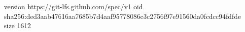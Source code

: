 version https://git-lfs.github.com/spec/v1
oid sha256:ded3aab47616aa7685b7d4aaf95778086c3c2756f97e91560da0fcdcc94fdfde
size 1612
